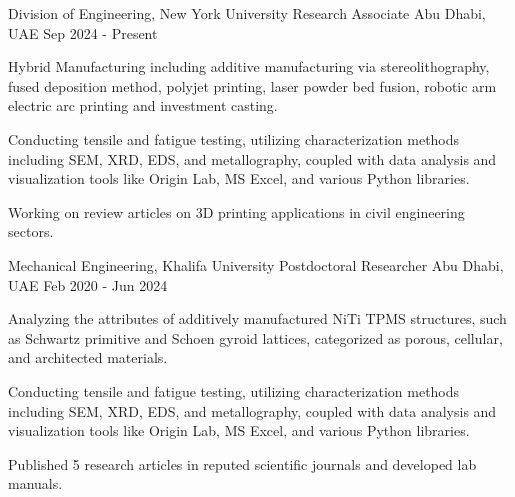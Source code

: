 

\begin{cventries}

  \cventry
    {Division of Engineering, New York University} %
    {Research Associate} %
    {Abu Dhabi, UAE} %
    {Sep 2024 - Present} %
    {
      \begin{cvitems} %
        \item {Hybrid Manufacturing including additive manufacturing via
        stereolithography, fused deposition method, polyjet printing,
        laser powder bed fusion, robotic arm electric arc printing and 
        investment casting.}
        \item {Conducting tensile and fatigue testing, utilizing characterization methods including SEM, XRD, EDS, and metallography, coupled with data analysis and visualization tools like Origin Lab, MS Excel, and various Python libraries.}
        \item {Working on review articles on 3D printing applications in 
        civil engineering sectors.}
      \end{cvitems}
    }
  \cventry
    {Mechanical Engineering, Khalifa University} %
    {Postdoctoral Researcher} %
    {Abu Dhabi, UAE} %
    {Feb 2020 - Jun 2024} %
    {
      \begin{cvitems} %
        \item {Analyzing the attributes of additively manufactured NiTi TPMS structures, such as Schwartz primitive and Schoen gyroid lattices, categorized as porous, cellular, and architected materials.}
        \item {Conducting tensile and fatigue testing, utilizing characterization methods including SEM, XRD, EDS, and metallography, coupled with data analysis and visualization tools like Origin Lab, MS Excel, and various Python libraries.}
        \item {Published 5 research articles in reputed scientific journals and developed lab manuals.}
      \end{cvitems}
    }


\end{cventries}
